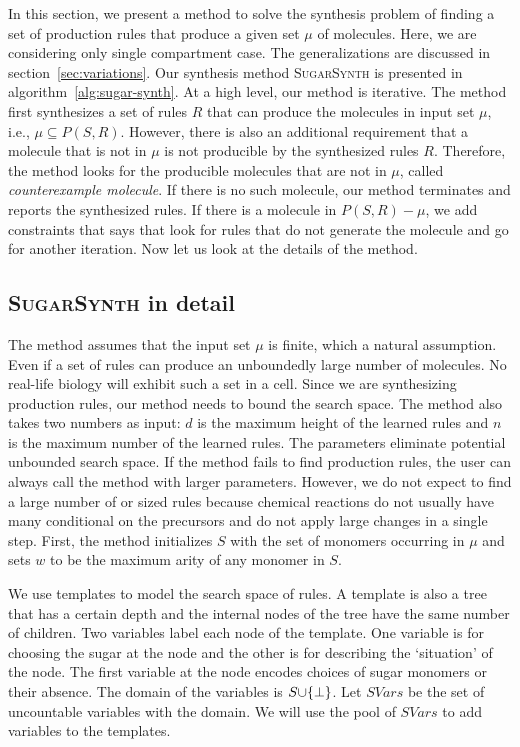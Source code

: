 In this section, we present a method to solve the synthesis problem of finding
a set of production rules that produce a given set $\mu$ of molecules.
Here, we are considering only single compartment case.
The generalizations are discussed in section~\ref{sec:variations}.
Our synthesis method \textsc{SugarSynth} is presented in algorithm~\ref{alg:sugar-synth}.
At a high level, our method is iterative.
The method first synthesizes a set of rules $R$ that can produce the molecules in input set $\mu$, i.e., $\mu \subseteq P(S,R)$.
However, there is also an additional requirement that a molecule
that is not in $\mu$ is not producible by the synthesized rules $R$.
Therefore, the method looks for the producible molecules that are not in $\mu$, called
{\em counterexample molecule}.
If there is no such molecule, our method terminates and reports
the synthesized rules.
If there is a molecule in $P(S,R) - \mu$, we add constraints that says
that look for rules
that do not generate
the molecule and go for another iteration.
Now let us look at the details of the method.



\subsection{\textsc{SugarSynth} in detail}

The method assumes that the input set $\mu$ is finite, which a
natural assumption.
Even if a set of rules can produce
an unboundedly large number of molecules.
No real-life biology will exhibit such a set in a cell.
Since we are synthesizing production rules, our method
needs to bound the search space.
The method also takes two numbers as input:
$d$ is the maximum height of the learned rules
and 
$n$ is the maximum number of the learned rules.
The parameters eliminate potential
unbounded search space.
If the method fails to find production rules,
the user can always call the method with larger parameters.
However, we do not expect to find a large number of or sized rules
because chemical reactions do not usually have many conditional
on the precursors and do not apply large changes in a single step.
First, the method initializes $S$ with the set of monomers occurring
in $\mu$
and sets $w$ to be the maximum arity of any monomer in $S$.


We use templates to model the search space of rules.
A template is also a tree that has a certain depth and
the internal nodes of the tree have the same number of children.
Two variables label each node of the template.
One variable is for choosing the sugar at the node and the other is for describing
the `situation' of the node.
The first variable at the node encodes choices of
sugar monomers or their absence.
The domain of the variables is $S {\cup} \{\bot\}$.
Let $SVars$ be the set of uncountable variables with the domain.
We will use the pool of $SVars$ to add variables to the templates.


